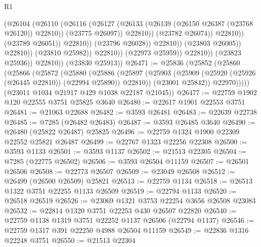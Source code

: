 \begin{lexlean}{R1}
\begin{coremodule}
                                              (@26104
                                                (@26110
                                                  (@26116
                                                    (@26127
                                                      (@26133
                                                        (@26139
                                                          (@26150 @26387 (@23768 @26120))
                                                          @22810))
                                                      (@23775 @26097))
                                                    @22810))
                                                (@23782 @26074))
                                              @22810))
                                          (@23789 @26051))
                                        @22810))
                                    (@23796 @26028))
                                  @22810))
                              (@23803 @26005))
                            @22810))
                        (@23810 @25982))
                      @22810))
                  (@22973 @25959))
                @22810))
            (@23823 @25936))
          @22810))
      (@23830 @25913))
@26471 := @25836
    (@25852
      (@25860
        (@25866
          (@25872
            (@25880
              (@25886
                (@25897
                  (@25903 (@25909 (@25920 (@25926 (@26445 @22810)) (@22994 @25890)) @22810))
                  (@23001 @25842))
                @22970)))))
      (@23011 @1034 @21917 @429 @1038 @22187 @21045))
@26477 := @22759 @1902 @120 @22555 @3751 @25825 @3640
@26480 := @22617 @1901 @22553 @3751
@26481 := @21063 @22688
@26482 := @3593 @26481
@26483 := @22639 @22738
@26485 := @7285 (@26482 @26483)
@26487 := @3593 @26485 @3640
@26490 := @26480 (@25822 @26487) @25825
@26496 := @22759 @1324 @1900 @22309 @22552 @25821 @26487
@26499 := @22767 @1323 @22256 @22308
@26500 := @3593 @1133
@26501 := @3593 @1137
@26502 := @21513 @22305
@26504 := @7285 (@22775 @26502)
@26506 := @3593 @26504 @11159
@26507 := @26501 @26506
@26508 := @22773 @26507
@26509 := @23049 @26508
@26512 := @26499 (@26500 @26509) @25821
@26513 := @22759 @1134
@26518 := @26513 @1322 @3751 @22255 @1133 @26509
@26519 := @22794 @1133
@26520 := @26518 @26519
@26526 := @23069 @1321 @3753 @22254 @3656 @26508 @23083
@26532 := @22814 @1320 @3751 @22253 @430 @26507 @22820
@26540 := @22759 @1138 @1319 @3751 @22252 @1137 @26506 (@22794 @1137)
@26546 := @22759 @1317 @391 @22250 @4988 @26504 @11159
@26549 := @22836 @1316 @22248 @3751
@26550 := @21513 @22304

\end{coremodule}
\end{lexlean}
